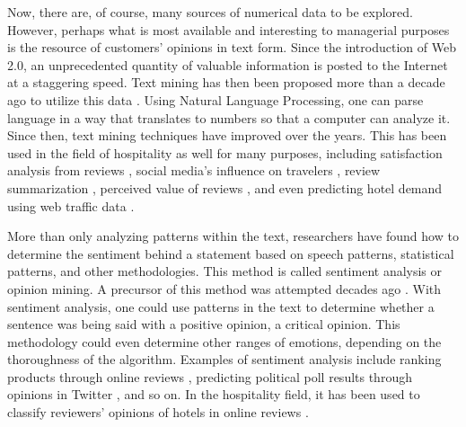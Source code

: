 \documentclass[smallextended,natbib]{svjour3}       %
\begin{document}
    Now, there are, of course, many sources of numerical data to be explored.  However, perhaps what is most available and interesting to managerial purposes is the resource of customers' opinions in text form. Since the introduction of Web 2.0, an unprecedented quantity of valuable information is posted to the Internet at a staggering speed. Text mining has then been proposed more than a decade ago to utilize this data \cite[e.g.][]{rajman1998text,nahm2002text}. Using Natural Language Processing, one can parse language in a way that translates to numbers so that a computer can analyze it. Since then, text mining techniques have improved over the years. This has been used in the field of hospitality as well for many purposes, including satisfaction analysis from reviews \cite[e.g][]{berezina2016, xu2016, xiang2015, hargreaves2015, balbi2018}, social media's influence on travelers \cite[e.g.][]{xiang2010}, review summarization \cite[e.g.][]{hu2017436}, perceived value of reviews \cite[e.g][]{FANG2016498}, and even predicting hotel demand using web traffic data \cite[e.g][]{yang2014}.

    More than only analyzing patterns within the text, researchers have found how to determine the sentiment behind a statement based on speech patterns, statistical patterns, and other methodologies. This method is called sentiment analysis or opinion mining. A precursor of this method was attempted decades ago \cite[][]{stone1966general}. With sentiment analysis, one could use patterns in the text to determine whether a sentence was being said with a positive opinion, a critical opinion. This methodology could even determine other ranges of emotions, depending on the thoroughness of the algorithm. Examples of sentiment analysis include ranking products through online reviews \cite[e.g][]{liu2017149, zhang2011}, predicting political poll results through opinions in Twitter \cite[][]{oconnor2010}, and so on. In the hospitality field, it has been used to classify reviewers' opinions of hotels in online reviews \cite[e.g.][]{kim2017362, alsmadi2018}. 
\end{document}
